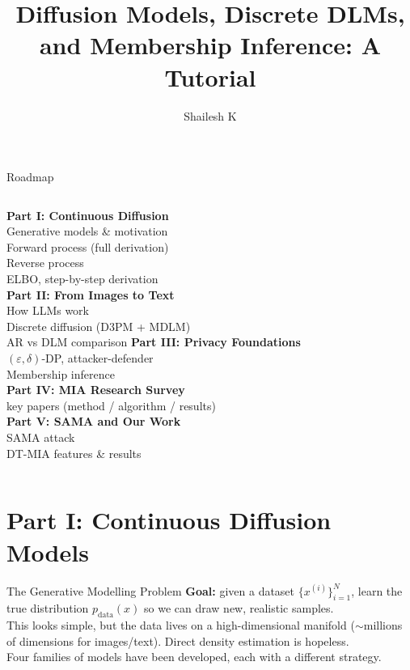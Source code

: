 \documentclass[10pt, aspectratio=169]{beamer}
\title{Diffusion Models, Discrete DLMs,\\and Membership Inference: A Tutorial}
\author{Shailesh K}
\institute{Indian Institute of Technology Madras \\ DA5001: Privacy in AI}
\date{}
\begin{document}

\maketitle

\begin{frame}{Roadmap}
  \begin{columns}[T]
    \textbf{Part I: Continuous Diffusion}\\[3pt]
    \quad Generative models \& motivation\\
    \quad Forward process (full derivation)\\
    \quad Reverse process\\
    \quad ELBO, step-by-step derivation\\[8pt]
    \textbf{Part II: From Images to Text}\\[3pt]
    \quad How LLMs work\\
    \quad Discrete diffusion (D3PM + MDLM)\\
    \quad AR vs DLM comparison
    \textbf{Part III: Privacy Foundations}\\[3pt]
    \quad $(\varepsilon,\delta)$-DP, attacker-defender\\
    \quad Membership inference\\[8pt]
    \textbf{Part IV: MIA Research Survey}\\[3pt]
     key papers (method / algorithm / results)\\[8pt]
    \textbf{Part V: SAMA and Our Work}\\[3pt]
    \quad SAMA attack\\
    \quad DT-MIA features \& results
  \end{columns}
\end{frame}

\section{Part I: Continuous Diffusion Models}


\begin{frame}{The Generative Modelling Problem}
  \textbf{Goal:} given a dataset $\{x^{(i)}\}_{i=1}^N$, learn the true distribution $p_{\mathrm{data}}(x)$
  so we can draw new, realistic samples.\\[10pt]
  This looks simple, but the data lives on a high-dimensional manifold ($\sim$millions of dimensions for images/text).
  Direct density estimation is hopeless.\\[10pt]
  Four families of models have been developed, each with a different strategy.
\end{frame}
\end{document}
